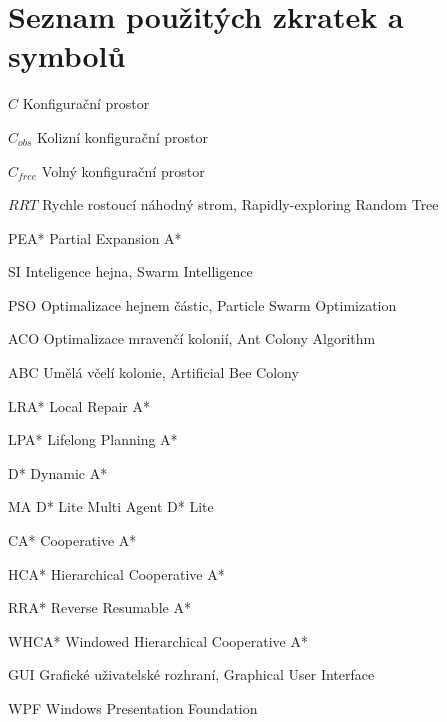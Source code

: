 
\chapter*{Seznam použitých zkratek a symbolů}
\symbolsize=3.5cm%
\begin{symboly}
	\item[$C$] Konfigurační prostor
	\item[$C_{obs}$] Kolizní konfigurační prostor
	\item[$C_{free}$] Volný konfigurační prostor
	\item[$RRT$] Rychle rostoucí náhodný strom, Rapidly-exploring Random Tree
	\item[PEA*] Partial Expansion A*
	\item[SI] Inteligence hejna, Swarm Intelligence
	\item[PSO] Optimalizace hejnem částic, Particle Swarm Optimization
	\item[ACO] Optimalizace mravenčí kolonií, Ant Colony Algorithm
	\item[ABC] Umělá včelí kolonie, Artificial Bee Colony
	\item[LRA*] Local Repair A*
	\item[LPA*] Lifelong Planning A*
	\item[D*] Dynamic A*
	\item[MA D* Lite] Multi Agent D* Lite
	\item[CA*] Cooperative A*
	\item[HCA*] Hierarchical Cooperative A*
	\item[RRA*] Reverse Resumable A*
	\item[WHCA*] Windowed Hierarchical Cooperative A*
	\item[GUI] Grafické uživatelské rozhraní, Graphical User Interface
	\item[WPF] Windows Presentation Foundation


\end{symboly}
